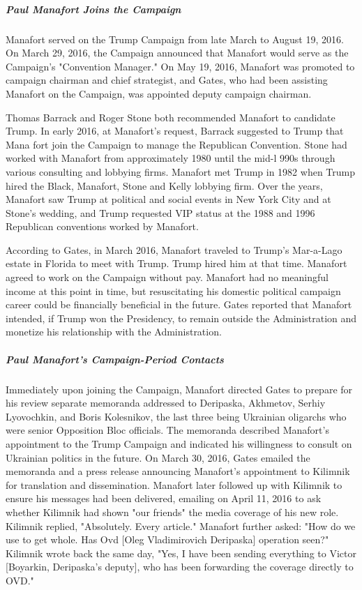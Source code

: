 \subparagraph{Paul Manafort Joins the Campaign}

Manafort served on the Trump Campaign from late March to August 19, 2016.
On March 29, 2016, the Campaign announced that Manafort would serve as the Campaign's "Convention Manager."%
On May 19, 2016, Manafort was promoted to campaign chairman and chief strategist, and Gates, who had been assisting Manafort on the Campaign, was appointed deputy campaign chairman.%

Thomas Barrack and Roger Stone both recommended Manafort to candidate Trump. %
In early 2016, at Manafort's request, Barrack suggested to Trump that Mana fort join the Campaign to manage the Republican Convention.%
Stone had worked with Manafort from approximately 1980 until the mid-l 990s through various consulting and lobbying firms. Manafort met Trump in 1982 when Trump hired the Black, Manafort, Stone and Kelly lobbying firm.%
Over the years, Manafort saw Trump at political and social events in New York City and at Stone's wedding, and Trump requested VIP status at the 1988 and 1996 Republican conventions worked by Manafort.%

According to Gates, in March 2016, Manafort traveled to Trump's Mar-a-Lago estate in Florida to meet with Trump. Trump hired him at that time.%
Manafort agreed to work on the Campaign without pay. Manafort had no meaningful income at this point in time, but resuscitating his domestic political campaign career could be financially beneficial in the future. Gates reported that Manafort intended, if Trump won the Presidency, to remain outside the Administration and monetize his relationship with the Administration.%

\subparagraph{Paul Manafort's Campaign-Period Contacts}

Immediately upon joining the Campaign, Manafort directed Gates to prepare for his review separate memoranda addressed to Deripaska, Akhmetov, Serhiy Lyovochkin, and Boris Kolesnikov,%
the last three being Ukrainian oligarchs who were senior Opposition Bloc officials. %
The memoranda described Manafort's appointment to the Trump Campaign and indicated his willingness to consult on Ukrainian politics in the future. On March 30, 2016, Gates emailed the memoranda and a press release announcing Manafort's appointment to Kilimnik for translation and dissemination.%
Manafort later followed up with Kilimnik to ensure his messages had been delivered, emailing on April 11, 2016 to ask whether Kilimnik had shown "our friends" the media coverage of his new role.%
Kilimnik replied, "Absolutely. Every article." Manafort further asked: "How do we use to get whole. Has Ovd [Oleg Vladimirovich Deripaska] operation seen?" Kilimnik wrote back the same day, "Yes, I have been sending everything to Victor [Boyarkin, Deripaska's deputy], who has been forwarding the coverage directly to OVD."%

